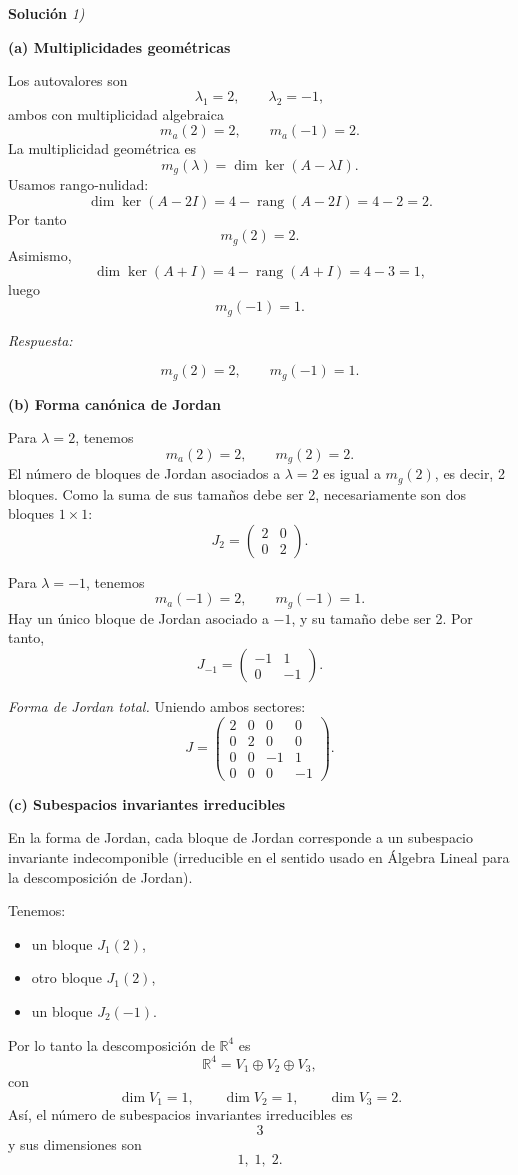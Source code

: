 \documentclass[11pt,spanish]{article}
\begin{document}
\vspace{0.5cm}
{\bf Soluci\'on }{\em 1)}
\vspace{0.5cm}

{\bf (a) Multiplicidades geométricas}

Los autovalores son
$$
\lambda_1=2,\qquad \lambda_2=-1,
$$
ambos con multiplicidad algebraica
$$
m_a(2)=2,\qquad m_a(-1)=2.
$$
La multiplicidad geométrica es
$$
m_g(\lambda)=\dim\ker(A-\lambda I).
$$
Usamos rango-nulidad:
$$
\dim\ker(A-2I)
=
4-\operatorname{rang}(A-2I)
=
4-2
=
2.
$$
Por tanto
$$
m_g(2)=2.
$$
Asimismo,
$$
\dim\ker(A+I)
=
4-\operatorname{rang}(A+I)
=
4-3
=
1,
$$
luego
$$
m_g(-1)=1.
$$

{\em Respuesta:}

$$
\boxed{m_g(2)=2,\qquad m_g(-1)=1.}
$$

{\bf (b) Forma canónica de Jordan}

Para $\lambda=2$, tenemos
$$
m_a(2)=2,\qquad m_g(2)=2.
$$
El número de bloques de Jordan asociados a $\lambda=2$ es igual a $m_g(2)$, es decir, 2 bloques.
Como la suma de sus tamaños debe ser 2, necesariamente son dos bloques $1\times 1$:
$$
J_{2}=
\begin{pmatrix}
2&0\\
0&2
\end{pmatrix}.
$$

Para $\lambda=-1$, tenemos
$$
m_a(-1)=2,\qquad m_g(-1)=1.
$$
Hay un único bloque de Jordan asociado a $-1$, y su tamaño debe ser 2.
Por tanto,
$$
J_{-1}
=
\begin{pmatrix}
-1&1\\
0&-1
\end{pmatrix}.
$$

{\em Forma de Jordan total.}
Uniendo ambos sectores:
$$
\boxed{
J=
\begin{pmatrix}
2&0&0&0\\
0&2&0&0\\
0&0&-1&1\\
0&0&0&-1
\end{pmatrix}.
}
$$

{\bf (c) Subespacios invariantes irreducibles}

En la forma de Jordan, cada bloque de Jordan corresponde a un subespacio invariante indecomponible (irreducible en el sentido usado en Álgebra Lineal para la descomposición de Jordan).

Tenemos:
\begin{itemize}
\item un bloque $J_1(2)$,
\item otro bloque $J_1(2)$,
\item un bloque $J_2(-1)$.
\end{itemize}
Por lo tanto la descomposición de $\mathbb R^4$ es
$$
\mathbb R^4
=
V_1\oplus V_2\oplus V_3,
$$
con
$$
\dim V_1=1,\qquad
\dim V_2=1,\qquad
\dim V_3=2.
$$
Así, el número de subespacios invariantes irreducibles es
$$
\boxed{3}
$$
y sus dimensiones son
$$
\boxed{1,\;1,\;2.}
$$
\end{document}
